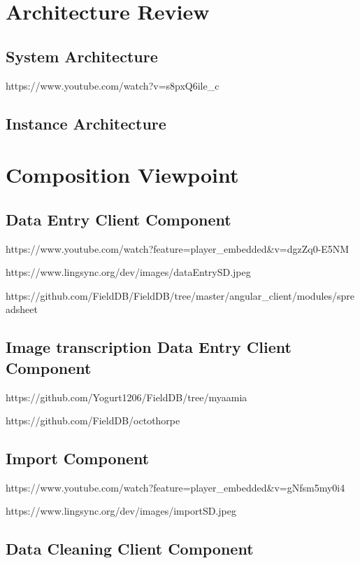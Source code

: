\documentclass[12pt]{article}
\begin{document}
\section{Architecture Review}
\subsection{System Architecture}

https://www.youtube.com/watch?v=s8pxQ6ile\_c

\subsection{Instance Architecture}

\section{Composition Viewpoint}
\subsection{Data Entry Client Component}

https://www.youtube.com/watch?feature=player\_embedded\&v=dgzZq0-E5NM

https://www.lingsync.org/dev/images/dataEntrySD.jpeg

https://github.com/FieldDB/FieldDB/tree/master/angular\_client/modules/spreadsheet

\subsection{Image transcription Data Entry Client Component}

https://github.com/Yogurt1206/FieldDB/tree/myaamia


https://github.com/FieldDB/octothorpe


\subsection{Import Component}

https://www.youtube.com/watch?feature=player\_embedded\&v=gNfsm5my0i4

https://www.lingsync.org/dev/images/importSD.jpeg

\subsection{Data Cleaning Client Component}
\end{document}
